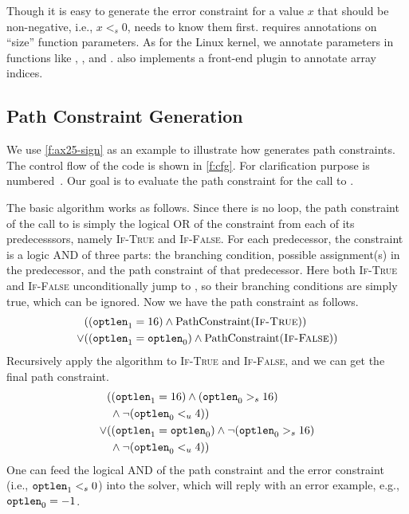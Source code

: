 Though it is easy to generate the error constraint for a value $x$
that should be non-negative, i.e., $x <_s 0$, \sys needs to know
them first.  \sys requires annotations on ``size'' function parameters.
As for the Linux kernel, we annotate parameters in functions like
, , and .
\sys also implements a front-end plugin to annotate array indices.

\subsection{Path Constraint Generation}

We use \autoref{f:ax25-sign} as an example to illustrate how \sys
generates path constraints.  The control flow of the code is shown
in \autoref{f:cfg}.  For clarification purpose  is
numbered~\cite[\chapterautorefname~8.11]{whale}.  Our goal is to
evaluate the path constraint for the call to .

The basic algorithm works as follows.  Since there is no loop, the
path constraint of the call to  is simply the
logical OR of the constraint from each of its predecesssors, namely
\textsc{If-True} and \textsc{If-False}.  For each predecessor, the
constraint is a logic AND of three parts: the branching condition,
possible assignment(s) in the predecessor, and the path constraint
of that predecessor.  Here both \textsc{If-True} and \textsc{If-False}
unconditionally jump to , so their branching
conditions are simply true, which can be ignored.  Now we have the
path constraint as follows.
\begin{align*}
& ((\texttt{optlen}_1 = 16) \land \operatorname{PathConstraint}(\textsc{If-True})) \\
\lor & ((\texttt{optlen}_1 = \texttt{optlen}_0) \land \operatorname{PathConstraint}(\textsc{If-False}))
\end{align*}
Recursively apply the algorithm to \textsc{If-True} and \textsc{If-False},
and we can get the final path constraint.
\begin{align*}
& ((\texttt{optlen}_1 = 16) \land (\texttt{optlen}_0 >_s 16) \\
& \; \land \neg(\texttt{optlen}_0 <_u 4)) \\
\lor & ((\texttt{optlen}_1 = \texttt{optlen}_0) \land \neg(\texttt{optlen}_0 >_s 16) \\
     & \; \land \neg(\texttt{optlen}_0 <_u 4))
\end{align*}
One can feed the logical AND of the path constraint and the error
constraint (i.e., $\texttt{optlen}_1 <_s 0$) into the solver, which
will reply with an error example, e.g., $\texttt{optlen}_0 = -1$.

